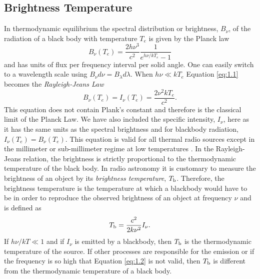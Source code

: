 \subsection{Brightness Temperature}\label{subsec:3.1.1}
In thermodynamic equilibrium the spectral distribution or brightness, $B_{\nu}$, of the radiation of a black body with temperature $T_{e}$ is given by the Planck law
\begin{equation}\label{eq:1.1}
B_{\nu}(T_{e})=\frac{2h\nu ^3}{c^2}\frac{1}{e^{h\nu /kT_{e}}-1}
\end{equation}
and has units of flux per frequency interval per solid angle. One can easily switch to a wavelength scale using  $B_{\nu}d\nu = B_{\lambda}d\lambda$. When $h\nu \ll kT_{e}$ Equation \ref{eq:1.1} becomes the \textit{Rayleigh-Jeans Law}
\begin{equation}
\label{eq:1.2}
B_{\nu}(T_{e})=I_{\nu}(T_{e})=\dfrac{2\nu ^2kT_{e}}{c^2}.
\end{equation}
This equation does not contain Plank's constant and therefore is the classical limit of the Planck Law. We have also included the specific intensity, $I_{\nu}$, here as it has the same units as the spectral brightness and for blackbody radiation, $I_{\nu}(T_{e}) = B_{\nu}(T_{e})$. This equation is valid for all thermal radio sources except in the millimeter or sub-millimeter regime at low temperatures \citep{rohlfs_1996}. In the Rayleigh-Jeans relation, the brightness is strictly proportional to the thermodynamic temperature of the black body. In radio astronomy it is customary to measure the brightness of an object by its \textit{brightness temperature}, $T_{\rm{b}}$. Therefore, the brightness temperature is the temperature at which a blackbody would have to be in order to reproduce the observed brightness of an object at frequency $\nu$ and is defined as
\begin{equation}\label{eq:1.3}
T_{\rm{b}}=\frac{c^2}{2k\nu ^2}I_{\nu}. 
\end{equation}
If $h\nu /kT \ll 1$ and if $I_{\nu}$ is emitted by a blackbody, then $T_{\rm{b}}$ is the thermodynamic temperature of the source. If other processes are responsible for the emission or if the frequency is so high that Equation \ref{eq:1.2} is not valid, then $T_{\rm{b}}$ is different from the thermodynamic temperature of a black body.

